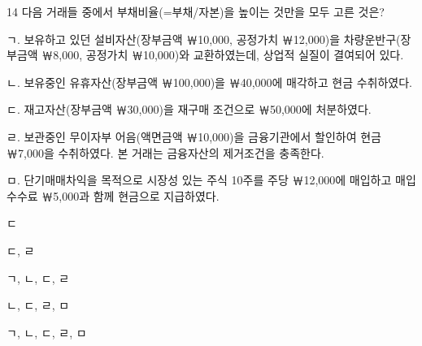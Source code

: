 \begin{question}{14}
다음 거래들 중에서 부채비율(=부채/자본)을 높이는 것만을 모두 고른 것은?
\begingroup
\begin{framedtext}
ㄱ. 보유하고 있던 설비자산(장부금액 ￦10,000, 공정가치 ￦12,000)을 차량운반구(장부금액 ￦8,000, 공정가치 ￦10,000)와 교환하였는데, 상업적 실질이 결여되어 있다. \par
ㄴ. 보유중인 유휴자산(장부금액 ￦100,000)을 ￦40,000에 매각하고 현금 수취하였다. \par
ㄷ. 재고자산(장부금액 ￦30,000)을 재구매 조건으로 ￦50,000에 처분하였다. \par
ㄹ. 보관중인 무이자부 어음(액면금액 ￦10,000)을 금융기관에서 할인하여 현금 ￦7,000을 수취하였다. 본 거래는 금융자산의 제거조건을 충족한다. \par
ㅁ. 단기매매차익을 목적으로 시장성 있는 주식 10주를 주당 ￦12,000에 매입하고 매입수수료 ￦5,000과 함께 현금으로 지급하였다. \par
\end{framedtext}
\endgroup
\begin{choices}
  \item ㄷ
  \item ㄷ, ㄹ
  \item ㄱ, ㄴ, ㄷ, ㄹ
  \item ㄴ, ㄷ, ㄹ, ㅁ
  \item ㄱ, ㄴ, ㄷ, ㄹ, ㅁ
\end{choices}
\end{question}
